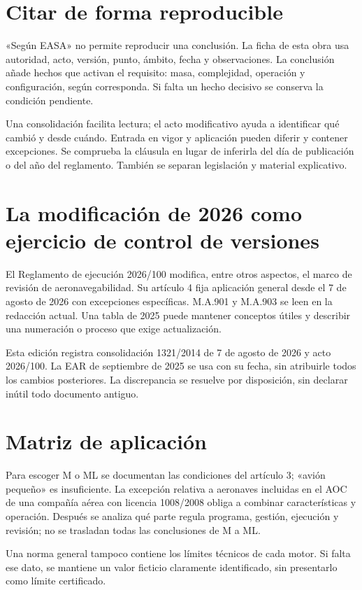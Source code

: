 
\section{Citar de forma reproducible}
«Según EASA» no permite reproducir una conclusión. La ficha de esta obra usa autoridad, acto, versión, punto, ámbito, fecha y observaciones. La conclusión añade hechos que activan el requisito: masa, complejidad, operación y configuración, según corresponda. Si falta un hecho decisivo se conserva la condición pendiente.

Una consolidación facilita lectura; el acto modificativo ayuda a identificar qué cambió y desde cuándo. Entrada en vigor y aplicación pueden diferir y contener excepciones. Se comprueba la cláusula en lugar de inferirla del día de publicación o del año del reglamento. También se separan legislación y material explicativo.
\section{La modificación de 2026 como ejercicio de control de versiones}
El Reglamento de ejecución 2026/100 modifica, entre otros aspectos, el marco de revisión de aeronavegabilidad. Su artículo 4 fija aplicación general desde el 7 de agosto de 2026 con excepciones específicas. M.A.901 y M.A.903 se leen en la redacción actual. Una tabla de 2025 puede mantener conceptos útiles y describir una numeración o proceso que exige actualización.

Esta edición registra consolidación 1321/2014 de 7 de agosto de 2026 y acto 2026/100. La EAR de septiembre de 2025 se usa con su fecha, sin atribuirle todos los cambios posteriores. La discrepancia se resuelve por disposición, sin declarar inútil todo documento antiguo.
\section{Matriz de aplicación}
Para escoger M o ML se documentan las condiciones del artículo 3; «avión pequeño» es insuficiente. La excepción relativa a aeronaves incluidas en el AOC de una compañía aérea con licencia 1008/2008 obliga a combinar características y operación. Después se analiza qué parte regula programa, gestión, ejecución y revisión; no se trasladan todas las conclusiones de M a ML.

Una norma general tampoco contiene los límites técnicos de cada motor. Si falta ese dato, se mantiene un valor ficticio claramente identificado, sin presentarlo como límite certificado.
